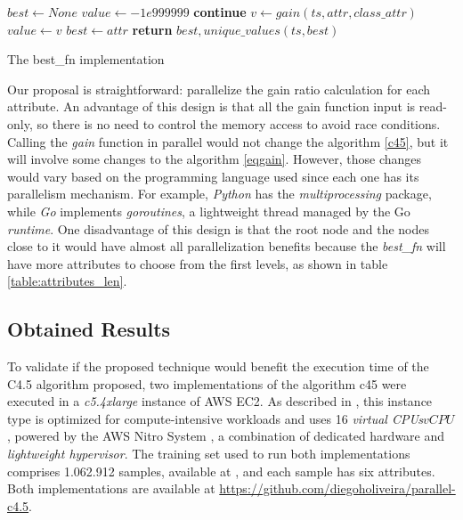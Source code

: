 \documentclass[conference]{IEEEtran}
\begin{document}
\begin{algorithm}
\begin{algorithmic}[1]
    \State $best \gets None$
    \State $value \gets -1e999999$
            \State \textbf{continue}
        \EndIf
        \State $v \gets gain(ts, attr, class\_attr)$
            \State $value \gets v$
            \State $best \gets attr$
        \EndIf
    \EndFor
    \State \textbf{return} $best, unique\_values(ts, best)$
\EndProcedure
\end{algorithmic}
\caption{The best\_fn implementation}
\label{best_fn}
\end{algorithm}

Our proposal is straightforward: parallelize the gain ratio calculation for each attribute. An advantage of this design is that all the gain function input is read-only, so there is no need to control the memory access to avoid race conditions. Calling the \textit{gain} function in parallel would not change the algorithm \ref{c45}, but it will involve some changes to the algorithm \ref{eqgain}. However, those changes would vary based on the programming language used since each one has its parallelism mechanism. For example, \textit{Python} has the \textit{multiprocessing} package, while \textit{Go} implements \textit{goroutines}, a lightweight thread managed by the Go \textit{runtime}. One disadvantage of this design is that the root node and the nodes close to it would have almost all parallelization benefits because the \textit{best\_fn} will have more attributes to choose from the first levels, as shown in table \ref{table:attributes_len}.

\subsection{Obtained Results}

To validate if the proposed technique would benefit the execution time of the C4.5 algorithm proposed, two implementations of the algorithm c45 were executed in a \textit{c5.4xlarge} instance of AWS EC2. As described in \cite{aws}, this instance type is optimized for compute-intensive workloads and uses 16 \textit{virtual CPUs\(vCPU\)}, powered by the AWS Nitro System \cite{aws-nitro}, a combination of dedicated hardware and \textit{lightweight hypervisor}. The training set used to run both implementations comprises 1.062.912 samples, available at \cite{data}, and each sample has six attributes. Both implementations are available at \url{https://github.com/diegoholiveira/parallel-c4.5}.
\end{document}
